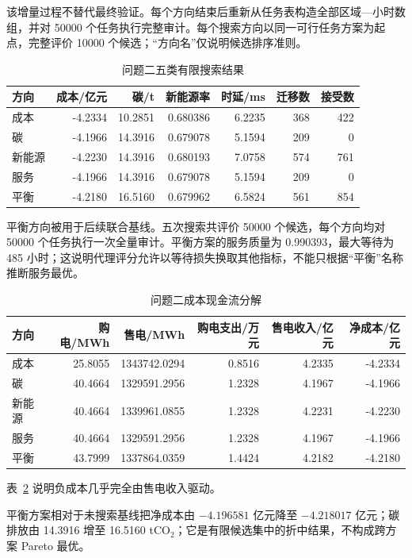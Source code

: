 该增量过程不替代最终验证。每个方向结束后重新从任务表构造全部区域—小时数组，并对 50000 个任务执行完整审计。每个搜索方向以同一可行任务方案为起点，完整评价 10000 个候选；“方向名”仅说明候选排序准则。

\begin{table}[H]\centering
{\small
\caption{问题二五类有限搜索结果}\label{tab:q2schemes}
\begin{tabular}{lrrrrrr}\toprule
方向 & 成本/亿元 & 碳/t & 新能源率 & 时延/ms & 迁移数 & 接受数\\\midrule
成本 & -4.2334 & 10.2851 & 0.680386 & 6.2235 & 368 & 422\\
碳 & -4.1966 & 14.3916 & 0.679078 & 5.1594 & 209 & 0\\
新能源 & -4.2230 & 14.3916 & 0.680193 & 7.0758 & 574 & 761\\
服务 & -4.1966 & 14.3916 & 0.679078 & 5.1594 & 209 & 0\\
平衡 & -4.2180 & 16.5160 & 0.679962 & 6.5824 & 561 & 854\\\bottomrule
\end{tabular}
}
\end{table}

平衡方向被用于后续联合基线。五次搜索共评价 50000 个候选，每个方向均对 50000 个任务执行一次全量审计。平衡方案的服务质量为 0.990393，最大等待为 485 小时；这说明代理评分允许以等待损失换取其他指标，不能只根据“平衡”名称推断服务最优。

\begin{table}[H]\centering
{\small
\caption{问题二成本现金流分解}\label{tab:q2cost}
\begin{tabular}{lrrrrr}\toprule
方向 & 购电/MWh & 售电/MWh & 购电支出/万元 & 售电收入/亿元 & 净成本/亿元\\\midrule
成本 & 25.8055 & 1343742.0294 & 0.8516 & 4.2335 & -4.2334\\
碳 & 40.4664 & 1329591.2956 & 1.2328 & 4.1967 & -4.1966\\
新能源 & 40.4664 & 1339961.0855 & 1.2328 & 4.2231 & -4.2230\\
服务 & 40.4664 & 1329591.2956 & 1.2328 & 4.1967 & -4.1966\\
平衡 & 43.7999 & 1337864.0359 & 1.4424 & 4.2182 & -4.2180\\\bottomrule
\end{tabular}
}
\end{table}

表~\ref{tab:q2cost} 说明负成本几乎完全由售电收入驱动。

平衡方案相对于未搜索基线把净成本由 $-4.196581$ 亿元降至 $-4.218017$ 亿元；碳排放由 14.3916 增至 16.5160 tCO$_2$；它是有限候选集中的折中结果，不构成跨方案 Pareto 最优。


